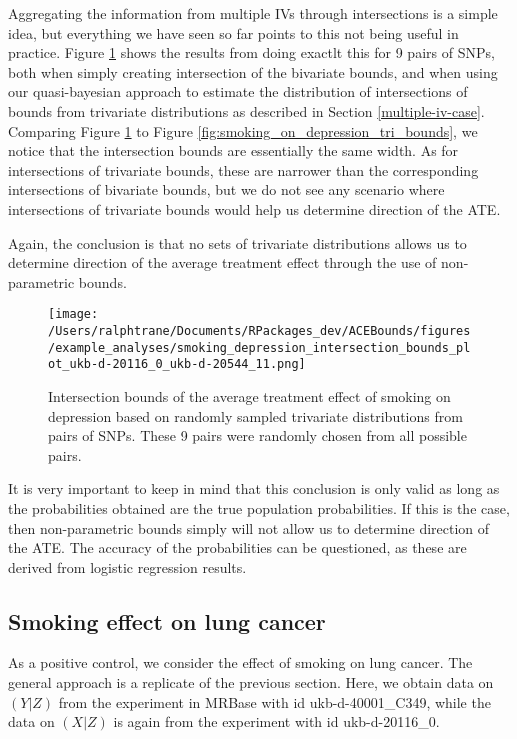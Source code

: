 \documentclass[
]{article}
\theoremstyle{plain}
\begin{document}
Aggregating the information from multiple IVs through intersections is a simple idea, but everything we have seen so far points to this not being useful in practice. Figure \ref{fig:smoking_on_depression_intersections} shows the results from doing exactlt this for 9 pairs of SNPs, both when simply creating intersection of the bivariate bounds, and when using our quasi-bayesian approach to estimate the distribution of intersections of bounds from trivariate distributions as described in Section \ref{multiple-iv-case}. Comparing Figure \ref{fig:smoking_on_depression_intersections} to Figure \ref{fig:smoking_on_depression_tri_bounds}, we notice that the intersection bounds are essentially the same width. As for intersections of trivariate bounds, these are narrower than the corresponding intersections of bivariate bounds, but we do not see any scenario where intersections of trivariate bounds would help us determine direction of the ATE.

Again, the conclusion is that no sets of trivariate distributions allows us to determine direction of the average treatment effect through the use of non-parametric bounds.

\begin{figure}[H]
  \centering
  \texttt{[image: /Users/ralphtrane/Documents/RPackages\_dev/ACEBounds/figures/example\_analyses/smoking\_depression\_intersection\_bounds\_plot\_ukb-d-20116\_0\_ukb-d-20544\_11.png]}
  \caption{Intersection bounds of the average treatment effect of smoking on depression based on randomly sampled trivariate distributions from pairs of SNPs. These 9 pairs were randomly chosen from all possible pairs.}
  \label{fig:smoking_on_depression_intersections}
\end{figure}

It is very important to keep in mind that this conclusion is only valid as long as the probabilities obtained are the true population probabilities. If this is the case, then non-parametric bounds simply will not allow us to determine direction of the ATE. The accuracy of the probabilities can be questioned, as these are derived from logistic regression results.

\hypertarget{smoking-effect-on-lung-cancer}{%
\subsection{Smoking effect on lung cancer}\label{smoking-effect-on-lung-cancer}}

As a positive control, we consider the effect of smoking on lung cancer. The general approach is a replicate of the previous section. Here, we obtain data on \((Y|Z)\) from the experiment in MRBase with id ukb-d-40001\_C349, while the data on \((X|Z)\) is again from the experiment with id ukb-d-20116\_0.
\end{document}
